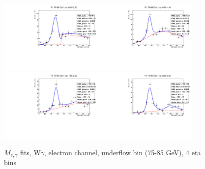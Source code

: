 \begin{figure}[htb]
  \begin{center}
   \includegraphics[width=0.45\textwidth]{../figs/figs_v11/ELECTRON_WGamma/EtoGammaFits/sa_hZmass_h_Data_EtoGamma_Enr_BARREL_pt75to85_ieta0_noWMtCut.pdf}\includegraphics[width=0.45\textwidth]{../figs/figs_v11/ELECTRON_WGamma/EtoGammaFits/sa_hZmass_h_Data_EtoGamma_Enr_BARREL_pt75to85_ieta1_noWMtCut.pdf}\\
   \includegraphics[width=0.45\textwidth]{../figs/figs_v11/ELECTRON_WGamma/EtoGammaFits/sa_hZmass_h_Data_EtoGamma_Enr_ENDCAP_pt75to85_ieta0_noWMtCut.pdf}\includegraphics[width=0.45\textwidth]{../figs/figs_v11/ELECTRON_WGamma/EtoGammaFits/sa_hZmass_h_Data_EtoGamma_Enr_ENDCAP_pt75to85_ieta1_noWMtCut.pdf}\\
  \label{fig:etogFits_75to85}
  \caption{$M_{e,\gamma}$ fits, W$\gamma$, electron channel, underflow bin (75-85 GeV), 4 eta bins}
  \end{center}
\end{figure}

